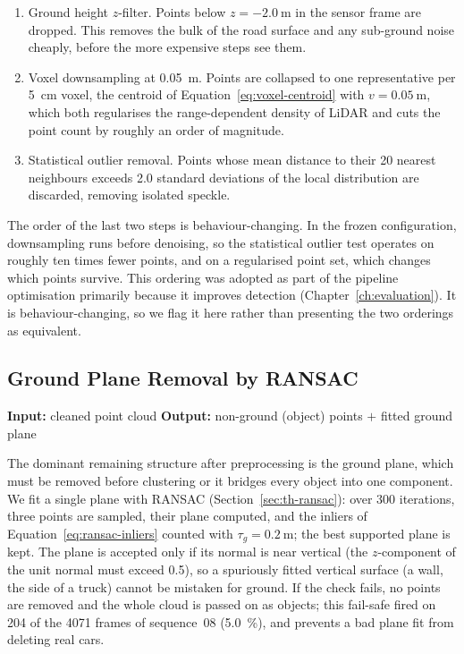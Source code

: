 \begin{enumerate}
  \item Ground height $z$-filter. Points below
    $z = \SI{-2.0}{\meter}$ in the sensor frame are dropped. This removes the bulk
    of the road surface and any sub-ground noise cheaply, before the more
    expensive steps see them.
  \item Voxel downsampling at \SI{0.05}{\meter}. Points are collapsed to
    one representative per \SI{5}{\centi\meter} voxel, the centroid of
    Equation~\eqref{eq:voxel-centroid} with $v=\SI{0.05}{\meter}$, which both regularises the
    range-dependent density of LiDAR and cuts the point count by roughly an order
    of magnitude.
  \item Statistical outlier removal. Points whose mean distance to their
    \num{20} nearest neighbours exceeds \num{2.0} standard deviations of the
    local distribution are discarded, removing isolated speckle.
\end{enumerate}

The order of the last two steps is behaviour-changing. In the frozen configuration,
downsampling runs before
denoising, so the statistical outlier test operates on roughly ten times fewer
points, and on a regularised point set, which changes which points survive.
This ordering was adopted as part of the pipeline optimisation primarily
because it improves detection (Chapter~\ref{ch:evaluation}). It is behaviour-changing, so
we flag it here rather than presenting the two orderings as equivalent.

\subsection{Ground Plane Removal by RANSAC}
\label{sec:pipeline-ground}

\noindent \textbf{Input:} cleaned point cloud \quad \textbar \quad \textbf{Output:} non-ground (object) points $+$ fitted ground plane \vspace{0.5em}

The dominant remaining structure after preprocessing is the ground plane, which
must be removed before clustering or it bridges every object into one component.
We fit a single plane with RANSAC (Section~\ref{sec:th-ransac}): over \num{300} iterations,
three points are sampled, their plane computed, and the inliers of
Equation~\eqref{eq:ransac-inliers} counted with $\tau_g=\SI{0.2}{\meter}$; the best
supported plane is kept. The plane is
accepted only if its normal is near vertical (the $z$-component of the
unit normal must exceed \num{0.5}), so a spuriously fitted vertical surface (a
wall, the side of a truck) cannot be mistaken for ground. If the check fails, no
points are removed and the whole cloud is passed on as objects; this fail-safe fired on
\num{204} of the \num{4071} frames of sequence~08 (\SI{5.0}{\percent}), and prevents a bad plane
fit from deleting real cars.

